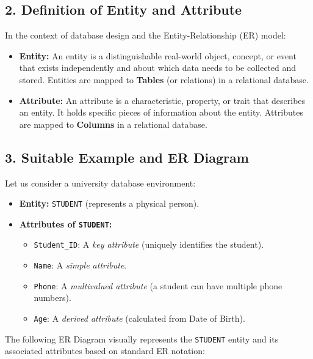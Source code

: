 \documentclass[12pt,a3paper]{article}
\begin{document}
\begin{enumerate}
\begin{tcolorbox}[enhanced,breakable,ansbox,colback=cA!4,colframe=cA,boxrule=0.8pt,arc=5pt,title={\textbf{Answer}},fonttitle=\bfseries\color{white},colbacktitle=cA]
\subsection*{2. Definition of Entity and Attribute}

In the context of database design and the Entity-Relationship (ER) model:

\begin{itemize}
    \item \textbf{Entity:} An entity is a distinguishable real-world object, concept, or event that exists independently and about which data needs to be collected and stored. Entities are mapped to \textbf{Tables} (or relations) in a relational database.
    \item \textbf{Attribute:} An attribute is a characteristic, property, or trait that describes an entity. It holds specific pieces of information about the entity. Attributes are mapped to \textbf{Columns} in a relational database.
\end{itemize}

\subsection*{3. Suitable Example and ER Diagram}

Let us consider a university database environment:
\begin{itemize}
    \item \textbf{Entity:} \texttt{STUDENT} (represents a physical person).
    \item \textbf{Attributes of \texttt{STUDENT}:} 
    \begin{itemize}
        \item \texttt{Student\_ID}: A \textit{key attribute} (uniquely identifies the student).
        \item \texttt{Name}: A \textit{simple attribute}.
        \item \texttt{Phone}: A \textit{multivalued attribute} (a student can have multiple phone numbers).
        \item \texttt{Age}: A \textit{derived attribute} (calculated from Date of Birth).
    \end{itemize}
\end{itemize}

The following ER Diagram visually represents the \texttt{STUDENT} entity and its associated attributes based on standard ER notation:


\end{tcolorbox}
\end{enumerate}
\end{document}
